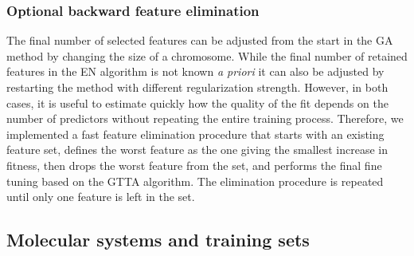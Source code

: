\documentclass[aip,jcp,reprint,amsmath,amssymb,nature]{revtex4-1}
\begin{document}



\subsubsection{Optional backward feature elimination} 

The final number of selected features can be adjusted from the start in the GA method by changing the size of a chromosome. 
While the final number of retained features in the EN algorithm is not known \emph{a priori} it can also be adjusted by restarting the method with different regularization strength. 
However, in both cases, it is useful to estimate quickly how the quality of the fit depends on the number of predictors without repeating the entire training process. 
Therefore, we implemented a fast feature elimination procedure that starts with an existing feature set, defines the worst feature as the one giving the smallest increase in fitness, then drops the worst feature from the set, and performs the final fine tuning based on the GTTA algorithm. The elimination procedure is repeated until only one feature is left in the set.

\subsection{Molecular systems and training sets} 
\end{document}
